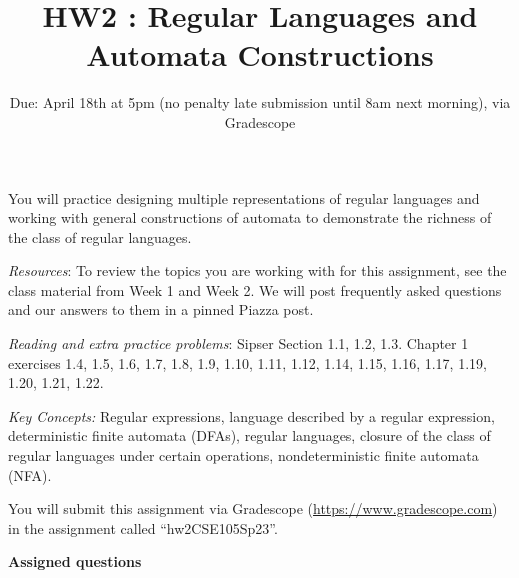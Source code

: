 \title{HW2 : Regular Languages and Automata Constructions}
\date{Due: April 18th at 5pm (no penalty late submission until 8am next morning), via Gradescope}


\maketitle
\thispagestyle{fancy}

You will practice designing multiple representations of regular languages and working with general 
constructions of automata to demonstrate the richness of the class of regular languages.

\textit{Resources}: To review the topics you are working with for this assignment, see the 
class material from Week 1 and Week 2. We will post frequently asked questions and our answers to them in a pinned Piazza post.

\textit{Reading and extra practice problems}: Sipser Section 1.1, 1.2, 1.3. 
Chapter 1 exercises 1.4, 1.5, 1.6, 1.7, 1.8, 1.9, 1.10, 1.11, 1.12, 1.14, 1.15, 1.16, 1.17, 1.19, 1.20, 1.21, 1.22.

\textit{Key Concepts:} Regular expressions, language described by a regular expression, 
deterministic finite automata (DFAs), regular languages, closure of the class of regular languages under certain operations, 
nondeterministic finite automata (NFA).

\instructions

You will submit this assignment via Gradescope
(\href{https://www.gradescope.com}{https://www.gradescope.com}) 
in the assignment called ``hw2CSE105Sp23''.

\textbf{Assigned questions}

